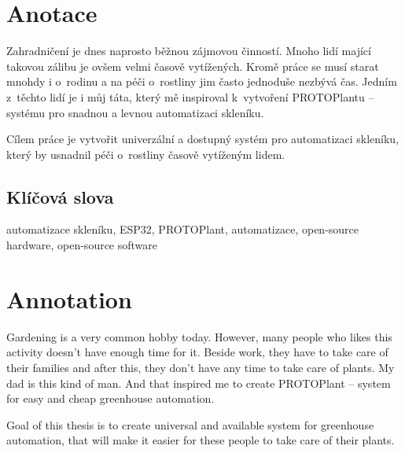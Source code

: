 \documentclass{template/socthesis}
\author{Petr Štourač}
\begin{document}
\maketitle



\pagestyle{empty}

\section*{Anotace}
Zahradničení je dnes naprosto běžnou zájmovou činností. Mnoho lidí mající takovou zálibu je ovšem velmi časově vytížených. Kromě práce se musí starat mnohdy i o~rodinu a na péči o~rostliny jim často jednoduše nezbývá čas. Jedním z~těchto lidí je i můj táta, který mě inspiroval k~vytvoření PROTOPlantu -- systému pro snadnou a levnou automatizaci skleníku. 

Cílem práce je vytvořit univerzální a dostupný systém pro automatizaci skleníku, který by usnadnil péči o~rostliny časově vytíženým lidem. 

\subsection*{Klíčová slova}
automatizace skleníku, ESP32, PROTOPlant, automatizace, open-source hardware, open-source software

\vspace{20mm}

\section*{Annotation}
Gardening is a very common hobby today. However, many people who likes this activity doesn't have enough time for it. Beside work, they have to take care of their families and after this, they don't have any time to take care of plants. My dad is this kind of man. And that inspired me to create PROTOPlant -- system for easy and cheap greenhouse automation.

Goal of this thesis is to create universal and available system for greenhouse automation, that will make it easier for these people to take care of their plants.
\end{document}
